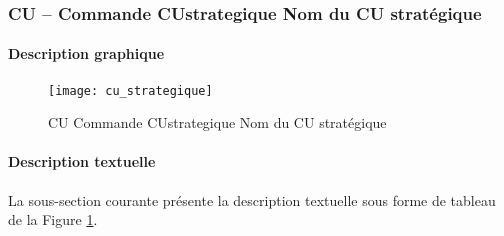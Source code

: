 \newcommand{\CUstrategique}{\complete Commande CUstrategique Nom du CU stratégique}

\subsubsection{CU -- \CUstrategique}
\label{sec:cu_strategique}
\paragraph{Description graphique}

\begin{figure}[H]
    \centering
    \texttt{[image: cu\_strategique]}
    \caption{CU \CUstrategique}
    \label{fig:cu_strategique}
\end{figure}

\paragraph{Description textuelle}
La sous-section courante présente la description textuelle sous forme de tableau de la Figure \ref{fig:cu_strategique}.


